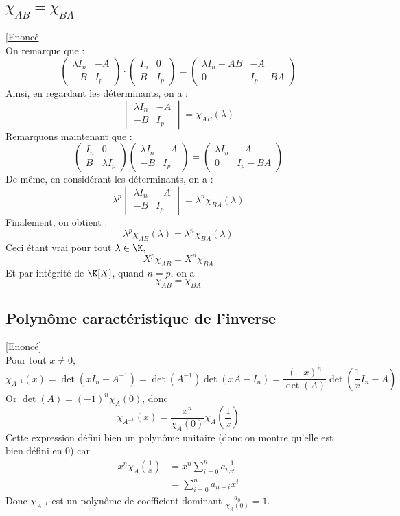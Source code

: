 \documentclass[8pt]{book}
\begin{document}
	\subsection{$\chi_{AB}=\chi_{BA}$}
	\label{chiAB=chiBA corrigé}
	\textcolor{blue}{\hyperref[chiAB=chiBA]{[Enoncé}}\\
	On remarque que : 
	\[\begin{pmatrix}
		\lambda I_n& -A\\
		-B&I_p
	\end{pmatrix}\cdot\begin{pmatrix}
	I_n&0\\B&I_p
	\end{pmatrix}=\begin{pmatrix}
	\lambda I_n-AB&-A\\0&I_p-BA
	\end{pmatrix}\]
	Ainsi, en regardant les déterminants, on a : 
	\[\begin{vmatrix}
		\lambda I_n& -A\\
		-B&I_p
	\end{vmatrix}=\chi_{AB}(\lambda)\]
	Remarquons maintenant que : 
	\[\begin{pmatrix}
		I_n&0\\B&\lambda I_p
	\end{pmatrix}\begin{pmatrix}
	\lambda I_n&-A\\-B&I_p\end{pmatrix}=\begin{pmatrix}
	\lambda I_n&-A\\0&I_p-BA
	\end{pmatrix}\]
	De même, en considérant les déterminants, on a :
	\[\lambda^p\begin{vmatrix}
		\lambda I_n&-A\\-B&I_p
	\end{vmatrix}=\lambda^n\chi_{BA}(\lambda)\]
	Finalement, on obtient :
	\[\lambda^p\chi_{AB}(\lambda)=\lambda^n\chi_{BA}(\lambda)\]
	Ceci étant vrai pour tout $\lambda\in\K$, \[X^p\chi_{AB}=X^n\chi_{BA}\]
	Et par intégrité de $\K[X]$, quand $n=p$, on a \[\chi_{AB}=\chi_{BA}\] 
	\subsection{Polynôme caractéristique de l'inverse}
	\label{Polynôme caractéristique de l'inverse corrigé}
	\textcolor{blue}{\hyperref[Polynôme caractérisque de l'inverse]{[Enoncé]}}\\
	Pour tout $x\ne 0$,
	\[\chi_{A^{-1}}(x)=\det(xI_n-A^{-1})=\det(A^{-1})\det(xA-I_n)=\frac{(-x)^n}{\det(A)}\det(\frac{1}{x}I_n-A)\]
	Or $\det(A)=(-1)^n\chi_A(0)$, donc \[\chi_{A^{-1}}(x)=\frac{x^n}{\chi_A(0)}\chi_A\left(\frac{1}{x}\right)\]
	Cette expression défini bien un polynôme unitaire (donc on montre qu'elle est bien défini en 0) car 
	\begin{align*}
		x^n\chi_A(\frac{1}{x})&=x^n\sum_{i=0}^{n}a_i\frac{1}{x^i}\\
		&=\sum_{i=0}^{n}a_{n-i}x^i
	\end{align*}
	Donc $\chi_{A^{-1}}$ est un polynôme de coefficient dominant $\displaystyle\frac{a_0}{\chi_A(0)}=1$.\\
	
\end{document}
